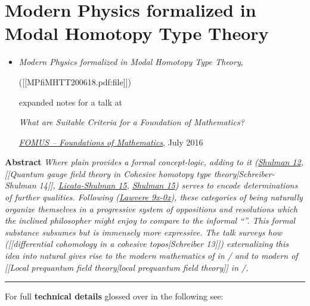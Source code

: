 \documentclass[12pt,titlepage]{article}
\theoremstyle{plain}
\theoremstyle{definition}
\theoremstyle{remark}
\begin{document}


\section*{Modern Physics formalized in Modal Homotopy Type Theory}

\begin{itemize}%
\item {}

\emph{Modern Physics formalized in Modal Homotopy Type Theory},

 ([[MPfiMHTT200618.pdf:file]])

expanded notes for a talk at

\emph{What are Suitable Criteria for a Foundation of Mathematics?}

\emph{\href{http://fomus.weebly.com/}{FOMUS -- Foundations of Mathematics}}, July 2016



\end{itemize}
\textbf{Abstract} \emph{Where plain  provides a formal concept-logic, adding   to it (\href{modal+type+theory}{Shulman 12}, [[Quantum gauge field theory in Cohesive homotopy type theory|Schreiber-Shulman 14]], \hyperlink{LicataShulman}{Licata-Shulman 15}, \hyperlink{Shulman15}{Shulman 15}) serves to encode determinations of further qualities. Following (\href{cohesive+topos#References}{Lawvere 9x-0x}), these categories of being naturally organize themselves in a progressive system of oppositions and resolutions which the inclined philosopher might enjoy to compare to the informal ``''. This formal substance subsumes   but is immensely more expressive. The talk surveys how ([[differential cohomology in a cohesive topos|Schreiber 13]]) externalizing this idea into natural  gives rise to the modern mathematics of  in / and to modern  of [[Local prequantum field theory|local prequantum field theory]] in /.}




\vspace{.5em} \hrule \vspace{.5em}
For full \textbf{technical details} glossed over in the following see:
\end{document}
